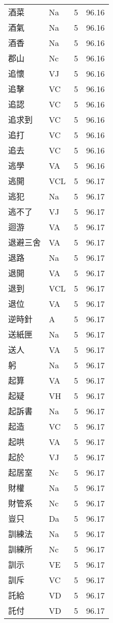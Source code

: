 \documentclass[twocolumn]{book}
\begin{document}
\begin{supertabular}{llrr}
酒菜 & Na & 5 &  96.16\\
酒氣 & Na & 5 &  96.16\\
酒香 & Na & 5 &  96.16\\
郡山 & Nc & 5 &  96.16\\
追懷 & VJ & 5 &  96.16\\
追擊 & VC & 5 &  96.16\\
追認 & VC & 5 &  96.16\\
追求到 & VC & 5 &  96.16\\
追打 & VC & 5 &  96.16\\
追去 & VC & 5 &  96.16\\
逃學 & VA & 5 &  96.16\\
逃開 & VCL & 5 &  96.17\\
逃犯 & Na & 5 &  96.17\\
逃不了 & VJ & 5 &  96.17\\
迴游 & VA & 5 &  96.17\\
退避三舍 & VA & 5 &  96.17\\
退路 & Na & 5 &  96.17\\
退開 & VA & 5 &  96.17\\
退到 & VCL & 5 &  96.17\\
退位 & VA & 5 &  96.17\\
逆時針 & A & 5 &  96.17\\
送紙匣 & Na & 5 &  96.17\\
送人 & VA & 5 &  96.17\\
躬 & Na & 5 &  96.17\\
起算 & VA & 5 &  96.17\\
起疑 & VH & 5 &  96.17\\
起訴書 & Na & 5 &  96.17\\
起造 & VC & 5 &  96.17\\
起哄 & VA & 5 &  96.17\\
起於 & VJ & 5 &  96.17\\
起居室 & Nc & 5 &  96.17\\
財權 & Na & 5 &  96.17\\
財管系 & Nc & 5 &  96.17\\
豈只 & Da & 5 &  96.17\\
訓練法 & Na & 5 &  96.17\\
訓練所 & Nc & 5 &  96.17\\
訓示 & VE & 5 &  96.17\\
訓斥 & VC & 5 &  96.17\\
託給 & VD & 5 &  96.17\\
託付 & VD & 5 &  96.17\\

\end{supertabular}
\end{document}
